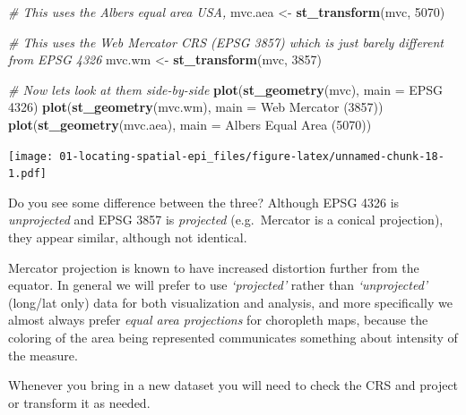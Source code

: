 \documentclass[
]{book}
\newenvironment{Shaded}{\begin{snugshade}}{\end{snugshade}}
\newcommand{\AttributeTok}[1]{\textcolor[rgb]{0.13,0.29,0.53}{#1}}
\newcommand{\CommentTok}[1]{\textcolor[rgb]{0.56,0.35,0.01}{\textit{#1}}}
\newcommand{\DecValTok}[1]{\textcolor[rgb]{0.00,0.00,0.81}{#1}}
\newcommand{\FunctionTok}[1]{\textcolor[rgb]{0.13,0.29,0.53}{\textbf{#1}}}
\newcommand{\NormalTok}[1]{#1}
\newcommand{\OtherTok}[1]{\textcolor[rgb]{0.56,0.35,0.01}{#1}}
\newcommand{\StringTok}[1]{\textcolor[rgb]{0.31,0.60,0.02}{#1}}
\begin{document}
\begin{Shaded}
\begin{Highlighting}[]
\CommentTok{\# This uses the Albers equal area USA, }
\NormalTok{mvc.aea }\OtherTok{\textless{}{-}} \FunctionTok{st\_transform}\NormalTok{(mvc, }\DecValTok{5070}\NormalTok{)}

\CommentTok{\# This uses the Web Mercator CRS (EPSG 3857) which is just barely different from EPSG 4326}
\NormalTok{mvc.wm }\OtherTok{\textless{}{-}} \FunctionTok{st\_transform}\NormalTok{(mvc, }\DecValTok{3857}\NormalTok{)}

\CommentTok{\# Now let\textquotesingle{}s look at them side{-}by{-}side}
\FunctionTok{plot}\NormalTok{(}\FunctionTok{st\_geometry}\NormalTok{(mvc), }\AttributeTok{main =} \StringTok{\textquotesingle{}EPSG 4326\textquotesingle{}}\NormalTok{)}
\FunctionTok{plot}\NormalTok{(}\FunctionTok{st\_geometry}\NormalTok{(mvc.wm), }\AttributeTok{main =} \StringTok{\textquotesingle{}Web Mercator (3857)\textquotesingle{}}\NormalTok{)}
\FunctionTok{plot}\NormalTok{(}\FunctionTok{st\_geometry}\NormalTok{(mvc.aea), }\AttributeTok{main =} \StringTok{\textquotesingle{}Albers Equal Area (5070)\textquotesingle{}}\NormalTok{)}
\end{Highlighting}
\end{Shaded}

\texttt{[image: 01-locating-spatial-epi\_files/figure-latex/unnamed-chunk-18-1.pdf]}

Do you see some difference between the three? Although EPSG 4326 is \emph{unprojected} and EPSG 3857 is \emph{projected} (e.g.~Mercator is a conical projection), they appear similar, although not identical.

Mercator projection is known to have increased distortion further from the equator. In general we will prefer to use \emph{`projected'} rather than \emph{`unprojected'} (long/lat only) data for both visualization and analysis, and more specifically we almost always prefer \emph{equal area projections} for choropleth maps, because the coloring of the area being represented communicates something about intensity of the measure.

Whenever you bring in a new dataset you will need to check the CRS and project or transform it as needed.
\end{document}
